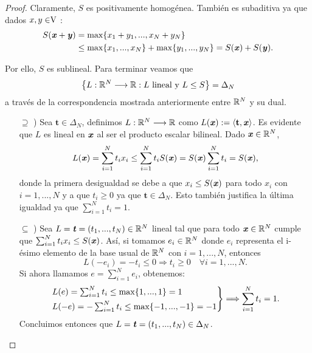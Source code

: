 \begin{proof}
	Claramente, $ S $ es positivamente homogénea. También es sub\-aditiva ya que dados $ x,y \in \vecSpace $ : 
	\begin{equation*}
	\begin{split}
	S(\textbf{\emph{x}}+\textbf{\emph{y}}) &= \max \{x_1 + y_1, ..., x_N +y_N \}\\ 
	&\leq \max\{x_1, ..., x_N\} + \max \{y_1, ...,y_N\} = S(\textbf{\emph{x}}) + S(\textbf{\emph{y}}).
	\end{split}
	\end{equation*}
	
	Por ello, $ S $ es sublineal. Para terminar veamos que  \[\left\lbrace L:\mathbb{R}^N \longrightarrow \mathbb{R} : L \text{ lineal y }L\leq S \right\rbrace  =  \Delta_N \]
	a través de la correspondencia mostrada anteriormente entre $ \mathbb{R}^N $ y su dual.
	
	\begin{itemize}
		\item[$ \supseteq $ )] Sea $ \mathbf{t} \in \Delta_N$, definimos $ L:\mathbb{R}^N \longrightarrow \mathbb{R} $ como $ L(\textbf{\emph{x}}):= \langle \mathbf{t},\textbf{\emph{x}} \rangle $. Es evidente que $ L $ es lineal en $ \textbf{\emph{x}} $ al ser el producto escalar bilineal. Dado $ \textbf{\emph{x}} \in \mathbb{R}^N $,
		\begin{equation*}
		L(\textbf{\emph{x}}) = \sum_{i=1}^{N}{t_i x_i} \leq \sum_{i=1}^{N}{t_i S(\textbf{\emph{x}})} = S(\textbf{\emph{x}})\sum_{i=1}^{N}{t_i} = S(\textbf{\emph{x}}),
		\end{equation*}
		donde la primera desigualdad se debe a que $ x_i \leq S(\textbf{\emph{x}})$ para todo $ x_i$ con $ i=1,...,N $ y a que $ t_i \geq 0 $ ya que $ \mathbf{t} \in \Delta_N$. Esto también justifica la última igualdad ya que $ \sum_{i=1}^{N}{t_i} = 1 $.
		
		\item[$ \subseteq $ )] Sea $ L = \textbf{\emph{t}} = (t_1,...,t_N) \in \mathbb{R}^N $ lineal tal que para todo $ \textbf{\emph{x}} \in \mathbb{R}^N $ cumple que $ \sum_{i=1}^{N}{t_i x_i} \leq S(\textbf{\emph{x}})$. Así, si tomamos $ e_i \in \mathbb{R}^N $ donde $ e_i $ representa el i-ésimo elemento de la base usual de $ \mathbb{R}^N $ con $ i=1,...,N $, entonces 		
		\begin{equation*}
		L(-e_i) = -t_i \leq 0 \Longrightarrow t_i \geq 0 \quad \forall i=1,...,N.
		\end{equation*}
		Si ahora llamamos $ e = \sum_{i=1}^{N}{e_i} $, obtenemos:
		\begin{equation*}
		\begin{rcases*}
		L(e) = \sum_{i=1}^{N}{t_i} \leq \max \{1, ...,1\} = 1 \\
		L(-e) = -\sum_{i=1}^{N}{t_i} \leq \max \{-1, ...,-1\} = -1
		\end{rcases*} \Longrightarrow \sum_{i=1}^{N}{t_i} = 1.
		\end{equation*}
		Concluimos entonces que $ L = \textbf{\emph{t}} = (t_1,...,t_N) \in \Delta_N $.
	\end{itemize}
	
\end{proof}
\bigskip

